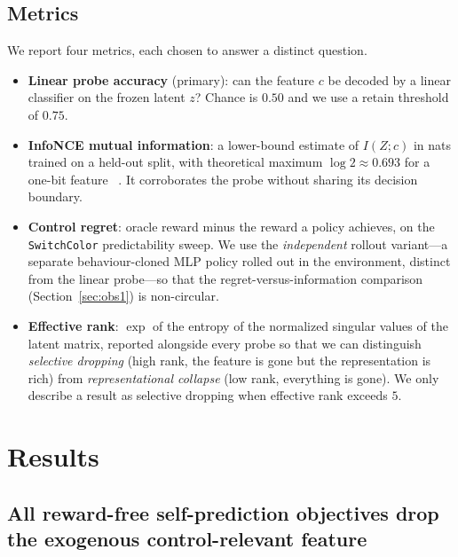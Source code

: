 \documentclass[11pt]{article}
\begin{document}
\subsection{Metrics}
\label{sec:metrics}
We report four metrics, each chosen to answer a distinct question.
\begin{itemize}
  \item \textbf{Linear probe accuracy} (primary): can the feature $c$ be decoded by a linear
  classifier on the frozen latent $z$? Chance is $0.50$ and we use a retain threshold of $0.75$.
  \item \textbf{InfoNCE mutual information}: a lower-bound estimate of $I(Z;c)$ in nats trained on a
  held-out split, with theoretical maximum $\log 2\approx0.693$ for a one-bit feature
  ~\citep{oord2018cpc}. It corroborates the probe without sharing its decision boundary.
  \item \textbf{Control regret}: oracle reward minus the reward a policy achieves, on the
  \texttt{SwitchColor} predictability sweep. We use the \emph{independent} rollout variant---a
  separate behaviour-cloned MLP policy rolled out in the environment, distinct from the linear
  probe---so that the regret-versus-information comparison (Section~\ref{sec:obs1}) is non-circular.
  \item \textbf{Effective rank}: $\exp$ of the entropy of the normalized singular values of the
  latent matrix, reported alongside every probe so that we can distinguish \emph{selective
  dropping} (high rank, the feature is gone but the representation is rich) from
  \emph{representational collapse} (low rank, everything is gone). We only describe a result as
  selective dropping when effective rank exceeds $5$.
\end{itemize}

\section{Results}

\subsection{All reward-free self-prediction objectives drop the exogenous control-relevant feature}
\label{sec:cell4}
\end{document}
